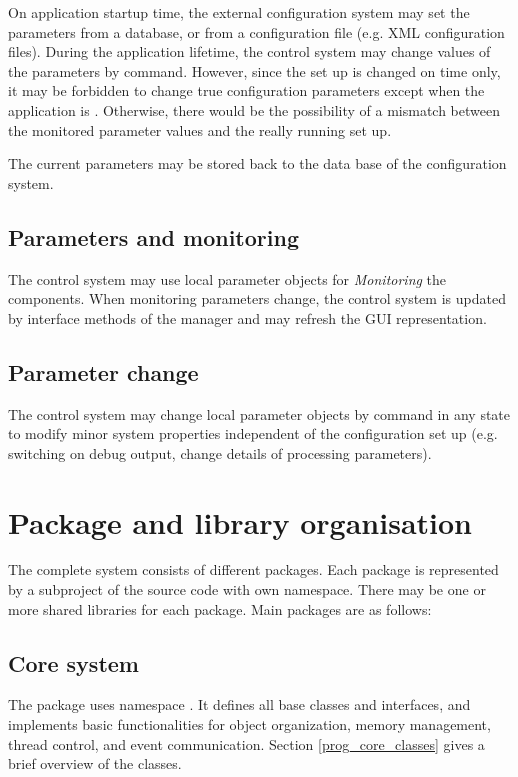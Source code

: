 On application startup time, the external configuration system may 
      set the parameters from a database, or from a configuration file 
      (e.g. XML configuration files). During the application lifetime, the control system may change 
      values of the parameters by command. However, since the set 
      up is changed on  time only, it may be forbidden to change 
      true configuration parameters except when the application is . 
      Otherwise, there would be the possibility of a mismatch between the 
      monitored parameter values and the really running set up.

The current parameters  may be stored back to the data 
      base of the configuration system.

      
\subsection{Parameters and monitoring}
The control system may use local parameter objects for 
   {\sl Monitoring} the components. When monitoring parameters change, 
   the control system is updated by interface methods of the 
   manager and may refresh the GUI representation.

\subsection{Parameter change}
The control system may change local parameter objects 
   by command in any state to modify minor system properties 
   independent of the configuration set up (e.g. switching on 
   debug output, change details of processing parameters).


\section{Package and library organisation}
The complete system consists of different packages. 
Each package is represented by a subproject of the source code with own namespace. 
There may be one or more shared libraries for each package. Main packages are as follows: 

\subsection{Core system}
The  package uses namespace .
It defines all base classes and interfaces, 
and implements basic functionalities for object organization, memory management, 
thread control, and event communication. Section \ref{prog_core_classes} gives a brief overview of the
  classes.
   

